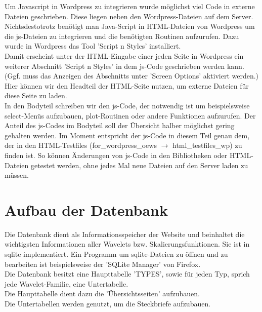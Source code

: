 \documentclass[11pt,a4paper,titlepage]{article}
\theoremstyle{plain} %
\theoremstyle{definition} %
\numberwithin{equation}{section} %
\begin{document}
	Um Javascript in Wordpress zu integrieren wurde möglichst viel Code in externe Dateien geschrieben. Diese liegen neben den Wordpress-Dateien auf dem Server.\\
	Nichtsdestotrotz benötigt man Java-Script in HTML-Dateien von Wordpress um die js-Dateien zu integrieren und die benötigten Routinen aufzurufen. Dazu wurde in Wordpress das Tool 'Script n Styles' installiert.\\
	Damit erscheint unter der HTML-Eingabe einer jeden Seite in Wordpress ein weiterer Abschnitt 'Script n Styles' in dem js-Code geschrieben werden kann.
	(Ggf. muss das Anzeigen des Abschnitts unter 'Screen Options' aktiviert werden.)\\
	Hier können wir den Headteil der HTML-Seite nutzen, um externe Dateien für diese Seite zu laden. \\
	In den Bodyteil schreiben wir den js-Code, der notwendig ist um beispielsweise select-Menüs aufzubauen, plot-Routinen oder andere Funktionen aufzurufen. Der Anteil des js-Codes im Bodyteil soll der Übersicht halber möglichst gering gehalten werden. Im Moment entspricht der js-Code in diesem Teil genau dem, der in den HTML-Testfiles (for\_wordpress\_oews $\rightarrow$ html\_testfiles\_wp) zu finden ist. So können Änderungen von js-Code in den Bibliotheken oder HTML-Dateien getestet werden, ohne jedes Mal neue Dateien auf den Server laden zu müssen.
		
	\section{Aufbau der Datenbank}
	
	Die Datenbank dient als Informationsspeicher der Website und beinhaltet die wichtigsten Informationen aller Wavelets bzw. Skalierungsfunktionen. Sie ist in sqlite implementiert. Ein Programm um sqlite-Dateien zu öffnen und zu bearbeiten ist beispielsweise der 'SQLite Manager' von Firefox.\\
	
	Die Datenbank besitzt eine Haupttabelle 'TYPES', sowie für jeden Typ, sprich jede Wavelet-Familie, eine Untertabelle.\\
	Die Haupttabelle dient dazu die 'Übersichtsseiten' aufzubauen.\\
	Die Untertabellen werden genutzt, um die Steckbriefe aufzubauen.\\
	
\end{document}
